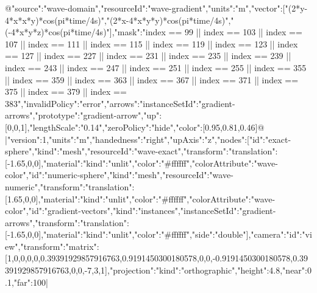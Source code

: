 \documentclass{article}
\begin{document}
@{"source":"wave-domain","resourceId":"wave-gradient","units":"m","vector":["(2*y-4*x*x*y)*cos(pi*time/4s)","(2*x-4*x*y*y)*cos(pi*time/4s)","(-4*x*y*z)*cos(pi*time/4s)"],"mask":"index == 99 || index == 103 || index == 107 || index == 111 || index == 115 || index == 119 || index == 123 || index == 127 || index == 227 || index == 231 || index == 235 || index == 239 || index == 243 || index == 247 || index == 251 || index == 255 || index == 355 || index == 359 || index == 363 || index == 367 || index == 371 || index == 375 || index == 379 || index == 383","invalidPolicy":"error","arrows":{"instanceSetId":"gradient-arrows","prototype":"gradient-arrow","up":[0,0,1],"lengthScale":"0.14","zeroPolicy":"hide","color":[0.95,0.81,0.46]}}@
\loomspace|{"version":1,"units":"m","handedness":"right","upAxis":"z","nodes":[{"id":"exact-sphere","kind":"mesh","resourceId":"wave-exact","transform":{"translation":[-1.65,0,0]},"material":{"kind":"unlit","color":"#ffffff","colorAttribute":"wave-color"}},{"id":"numeric-sphere","kind":"mesh","resourceId":"wave-numeric","transform":{"translation":[1.65,0,0]},"material":{"kind":"unlit","color":"#ffffff","colorAttribute":"wave-color"}},{"id":"gradient-vectors","kind":"instances","instanceSetId":"gradient-arrows","transform":{"translation":[-1.65,0,0]},"material":{"kind":"unlit","color":"#ffffff","side":"double"}}],"camera":{"id":"view","transform":{"matrix":[1,0,0,0,0,0.39391929857916763,0.9191450300180578,0,0,-0.9191450300180578,0.39391929857916763,0,0,-7,3,1]},"projection":{"kind":"orthographic","height":4.8,"near":0.1,"far":100}}}|
\end{document}
